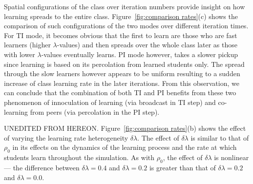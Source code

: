 \documentclass[twocolumn,secnumarabic,amssymb, nobibnotes, aps, prd]{revtex4-2}
\begin{document}
        Spatial configurations of the class over iteration numbers provide insight on how learning spreads to the entire class.
        Figure~\ref{fig:comparison rates}(c) shows the comparison of such configurations of the two modes over different iteration times.
        For TI mode, it becomes obvious that the first to learn are those who are fast learners (higher $\lambda$-values) and then spreads over the whole class later as those with lower $\lambda$-values eventually learns.
        PI mode however, takes a slower pickup since learning is based on its percolation from learned students only.
        The spread through the slow learners however appears to be uniform resulting to a sudden increase of class learning rate in the later iterations.
        From this observation, we can conclude that the combination of both TI and PI benefits from these two phenomenon of innoculation of learning (via broadcast in TI step) and co-learning from peers (via percolation in the PI step).

        {\color{red} UNEDITED FROM HEREON.}
        Figure~\ref{fig:comparison rates}(b) shows the effect of varying the learning rate heterogeneity $\delta\lambda$.
        The effect of $\delta\lambda$ is similar to that of $\rho_0$ in its effects on the dynamics of the learning process and the rate at which students learn throughout the simulation.
        As with $\rho_0$, the effect of $\delta\lambda$ is nonlinear --- the difference between $\delta\lambda=0.4$ and $\delta\lambda=0.2$ is greater than that of $\delta\lambda=0.2$ and $\delta\lambda=0.0$.


        
        
\end{document}
